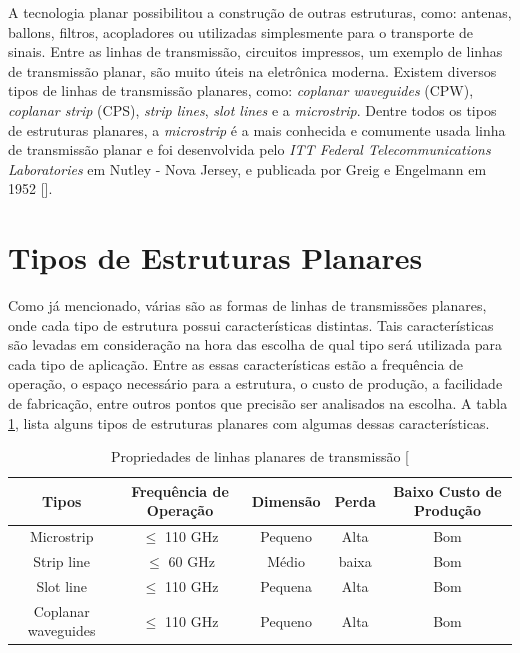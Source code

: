 A tecnologia planar possibilitou a construção de outras estruturas, como: antenas, ballons, filtros, acopladores ou utilizadas simplesmente para o transporte de sinais. Entre as linhas de transmissão, circuitos impressos, um exemplo de linhas de transmissão planar, são muito úteis na eletrônica moderna. Existem diversos tipos de linhas de transmissão planares, como: \textit{coplanar waveguides} (CPW), \textit{coplanar strip} (CPS), \textit{strip lines}, \textit{slot lines} e a \textit{microstrip}. Dentre todos os tipos de estruturas planares, a \textit{microstrip} é a mais conhecida e comumente usada linha de transmissão planar e foi desenvolvida pelo \textit{ITT Federal Telecommunications Laboratories} em Nutley - Nova Jersey, e publicada por Greig e Engelmann em 1952 [\cite{Grieg}].

\section{Tipos de Estruturas Planares}
Como já mencionado, várias são as formas de linhas de transmissões planares, onde cada tipo de estrutura possui características distintas. Tais características são levadas em consideração na hora das escolha de qual tipo será utilizada para cada tipo de aplicação. Entre as essas características estão a frequência de operação, o espaço necessário para a estrutura, o custo de produção, a facilidade de fabricação, entre outros pontos que precisão ser analisados na escolha. A tabla \ref{tab:propriedades}, lista alguns tipos de estruturas planares com algumas dessas características.


\begin{table}[h]
\begin{center}
\caption{Propriedades de linhas planares de transmissão [\cite{Nguyen}}
\label{tab:propriedades}
	\begin{tabular}{|c c c c c|}
		\hline
		Tipos 				& Frequência de Operação	& Dimensão 	& Perda	& Baixo Custo de Produção \\
		\hline
		Microstrip 			& $\leq$ 110 GHz			& Pequeno	& Alta	& Bom\\
		Strip line 			& $\leq$ 60 GHz				& Médio		& baixa	& Bom\\
		Slot line			& $\leq$ 110 GHz			& Pequena	& Alta	& Bom\\
		Coplanar waveguides & $\leq$ 110 GHz			& Pequeno	& Alta 	& Bom\\
		\hline
	\end{tabular}
	\end{center}
\end{table}

